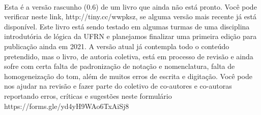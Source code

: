 \thispagestyle{empty}
\onecolumn
\ 
\vfill

\parbox{3 in}{
Esta é a versão rascunho (0.6) de um livro que ainda não está pronto.
Você pode verificar neste link, \hbox{http://tiny.cc/wwpksz}, se alguma versão mais recente já está disponível.
Este livro está sendo testado em algumas turmas de uma disciplina introdutória de lógica da UFRN e planejamos finalizar uma primeira edição para publicação ainda em 2021. 
A versão atual já contempla todo o conteúdo pretendido, mas o livro, de autoria coletiva, está em processo de revisão e ainda sofre com certa falta de padronização de notação e nomenclatura, falta de homogeneização do tom, além de muitos erros de escrita e digitação.
Você pode nos ajudar na revisão e fazer parte do coletivo de co-autores e co-autoras reportando erros, críticas e sugestões neste formulário
\hbox{https://forms.gle/yd4yH9WAo6TxAiSj8}
}

\vfill

\parbox{3 in}{

}
\vfill
